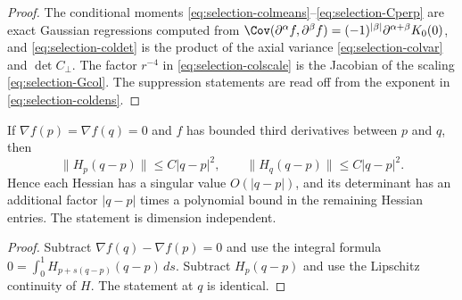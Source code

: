 \begin{proof}
The conditional moments \eqref{eq:selection-colmeans}--\eqref{eq:selection-Cperp} are exact Gaussian regressions computed from $\Cov(\partial^\alpha f,\partial^\beta f)=(-1)^{|\beta|}\partial^{\alpha+\beta}K_0(0)$, and \eqref{eq:selection-coldet} is the product of the axial variance \eqref{eq:selection-colvar} and $\det C_\perp$. The factor $r^{-4}$ in \eqref{eq:selection-colscale} is the Jacobian of the scaling \eqref{eq:selection-Gcol}. The suppression statements are read off from the exponent in \eqref{eq:selection-coldens}.
\end{proof}

\begin{lemma}\label{lem:selection-collision}
If $\nabla f(p)=\nabla f(q)=0$ and $f$ has bounded third derivatives between $p$ and $q$, then
\begin{equation}\label{eq:selection-collision}
\|H_p(q-p)\|\le C|q-p|^2,\qquad\|H_q(q-p)\|\le C|q-p|^2 .
\end{equation}
Hence each Hessian has a singular value $O(|q-p|)$, and its determinant has an additional factor $|q-p|$ times a polynomial bound in the remaining Hessian entries. The statement is dimension independent.
\end{lemma}

\begin{proof}
Subtract $\nabla f(q)-\nabla f(p)=0$ and use the integral formula $0=\int_0^1H_{p+s(q-p)}(q-p)\,ds$. Subtract $H_p(q-p)$ and use the Lipschitz continuity of $H$. The statement at $q$ is identical.
\end{proof}

